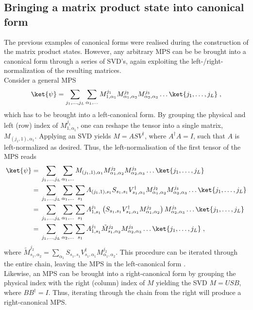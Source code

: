\subsection{Bringing a matrix product state into canonical form}
The previous examples of canonical forms were realised during the construction of the matrix product states. However, any arbitrary MPS can be be brought into a canonical form through a series of SVD's, again exploiting the left-/right-normalization of the resulting matrices.\\
Consider a general MPS
\begin{equation}
	\ket{\psi} = \sum_{j_1 , \ldots , j_L} \sum_{\alpha_1 , \ldots } M_{1 , \alpha_1}^{j_1} M_{\alpha_1 , \alpha_2}^{j_2} M_{\alpha_2 , \alpha_3}^{j_3} \ldots \ket{j_1 , \ldots , j_L} \; , 
	\label{eq:generalMPS}
\end{equation}
which has to be brought into a left-canonical form. By grouping the physical and left (row) index of $M_{1 , \alpha_1}^{j_1}$, one can reshape the tensor into a single matrix, $M_{(j_1 , 1) , \alpha_1}$. Applying an SVD yields $M = A S V^{\dag}$, where $A^{\dag} A = I$, such that $A$ is left-normalized as desired. Thus, the left-normalisation of the first tensor of the MPS reads
\begin{align}
\ket{\psi} = & \; \sum_{j_1 , \ldots , j_L} \sum_{\alpha_1 , \ldots } M_{(j_1 , 1) , \alpha_1} M_{\alpha_1 , \alpha_2}^{j_2} M_{\alpha_2 , \alpha_3}^{j_3} \ldots \ket{j_1 , \ldots , j_L} \nonumber \\
= & \; \sum_{j_1 , \ldots , j_L} \sum_{\alpha_1 , \ldots } \sum_{s_1} A_{(j_1 , 1) , s_1} S_{s_1 , s_1} V_{s_1 , \alpha_1}^{\dag} M_{\alpha_1 , \alpha_2}^{j_2} M_{\alpha_2 , \alpha_3}^{j_3} \ldots \ket{j_1 , \ldots , j_L} \nonumber \\
= & \; \sum_{j_1 , \ldots , j_L} \sum_{\alpha_1 , \ldots } \sum_{s_1} A_{1 , s_1}^{j_1} \left( S_{s_1 , s_1} V_{s_1 , \alpha_1}^{\dag} M_{\alpha_1 , \alpha_2}^{j_2} \right) M_{\alpha_2 , \alpha_3}^{j_3} \ldots \ket{j_1 , \ldots , j_L} \nonumber \\
= & \; \sum_{j_1 , \ldots , j_L} \sum_{\alpha_2 , \ldots } \sum_{s_1} A_{1 , s_1}^{j_1} \tilde{M}_{s_1 , \alpha_2}^{j_2} M_{\alpha_2 , \alpha_3}^{j_3} \ldots \ket{j_1 , \ldots , j_L} \; ,
\end{align}
where $\tilde{M}_{s_1 , \alpha_2}^{j_2} = \sum_{\alpha_1} S_{s_1 , s_1} V_{s_1 , \alpha_1}^{\dag} M_{\alpha_1 , \alpha_2}^{j_2}$. This procedure can be iterated through the entire chain, leaving the MPS in the left-canonical form \cite{schollwock}.\\
Likewise, an MPS can be brought into a right-canonical form by grouping the physical index with the right (column) index of $M$ yielding the SVD $M = U S B$, where $B B^{\dag} = I$. Thus, iterating through the chain from the right will produce a right-canonical MPS.

